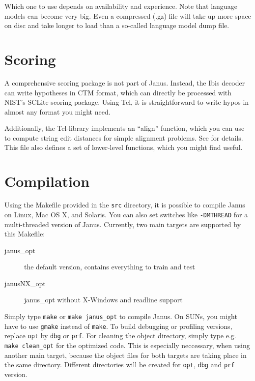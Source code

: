 \documentclass[a4paper,twoside]{book}
\newcommand{\Jref}      [2]{\htmlref{\texttt{#2}}{#1:#2}}
\begin{document}
Which one to use depends on availability and experience. Note that
language models can become very big. Even a compressed (.gz) file will
take up more space on disc and take longer to load than a so-called
language model dump file.


\section{Scoring} \label{basic:scoring}

A  comprehensive scoring  package is  not  part of Janus. Instead, the
Ibis decoder can write hypotheses in CTM format, which can directly be
processed     with NIST's SCLite scoring   package.   Using Tcl, it is
straightforward to write hypos in almost any format you might need.

Additionally, the Tcl-library  implements an ``align'' function, which
you  can  use to  compute string  edit distances for  simple alignment
problems.  See  \Jref{lib}{align.tcl}  for  details.   This file  also
defines a set of lower-level functions, which you might find useful.


\section{Compilation} \label{basic:compiling}

Using  the   Makefile provided  in the \texttt{src}   directory, it is
possible to  compile Janus  on Linux, Mac OS X,   and Solaris.  You can  also set
switches like \texttt{-DMTHREAD}    for a multi-threaded version    of
Janus. Currently, two main targets are supported by this Makefile:

\begin{description}
\item[janus\_opt] the default version, contains everything to train and test
\item[janusNX\_opt] janus\_opt without X-Windows and readline support
\end{description}

Simply  type  \texttt{make}  or  \texttt{make  janus\_opt}  to compile
Janus. On SUNs,   you might  have  to  use \texttt{gmake} instead   of
\texttt{make}.   To build  debugging   or profiling  versions, replace
\texttt{opt} by \texttt{dbg}  or \texttt{prf}. For cleaning the object
directory,    simply  type e.g.      \texttt{make clean\_opt}  for the
optimized  code.  This  is especially neccessary,   when using another
main  target, because  the  object files for   both targets are taking
place in the same directory. Different directories will be created for
\texttt{opt}, \texttt{dbg} and \texttt{prf} version.
\end{document}
